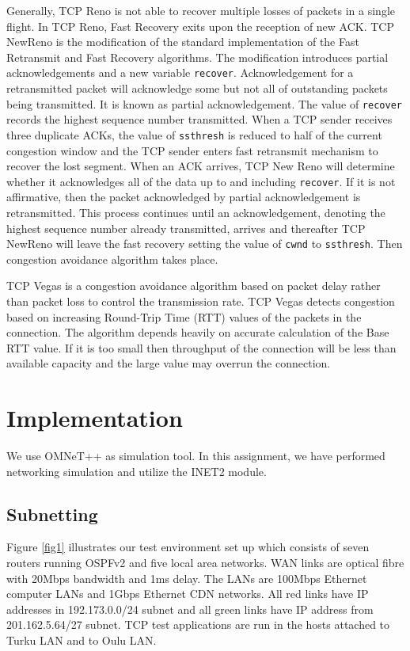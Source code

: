 \documentclass[conference,a4paper]{../../sty/IEEEtran}
\begin{document}
Generally, TCP Reno \cite{tcpreno} is not able to recover multiple losses of packets in a single flight. In TCP Reno, Fast Recovery exits upon the reception of new ACK. TCP NewReno is the modification of the standard implementation of the Fast Retransmit and Fast Recovery algorithms. The modification introduces partial acknowledgements and a new variable \texttt{recover}. Acknowledgement for a retransmitted packet will acknowledge some but not all of outstanding packets being transmitted. It is known as partial acknowledgement. The value of \texttt{recover} records the highest sequence number transmitted. When a TCP sender receives three duplicate ACKs, the value of \texttt{ssthresh} is reduced to half of the current congestion window and the TCP sender enters fast retransmit mechanism to recover the lost segment. When an ACK arrives, TCP New Reno will determine whether it acknowledges all of the data up to and including \texttt{recover}. If it is not affirmative, then the packet acknowledged by partial acknowledgement is retransmitted. This process continues until an acknowledgement, denoting the highest sequence number already transmitted, arrives and thereafter TCP NewReno \cite{tcpnewreno} will leave the fast recovery setting the value of \texttt{cwnd} to \texttt{ssthresh}. Then congestion avoidance algorithm takes place.


TCP Vegas \cite{brakmo1995tcp} is a congestion avoidance algorithm based on packet delay rather than packet loss to control the transmission rate. TCP Vegas detects congestion based on increasing Round-Trip Time (RTT) values of the packets in the connection. The algorithm depends heavily on accurate calculation of the Base RTT value. If it is too small then throughput of the connection will be less than available capacity and the large value may overrun the connection.

\section{Implementation}
We use OMNeT++ as simulation tool. In this assignment, we have performed networking simulation and utilize the INET2 module.

\subsection{Subnetting}

Figure \ref{fig1} illustrates our test environment set up which consists of seven routers running OSPFv2 and five local area networks.
WAN links are optical fibre with 20Mbps bandwidth and 1ms delay.
The LANs are 100Mbps Ethernet computer LANs and 1Gbps Ethernet CDN networks.
All red links have IP addresses in 192.173.0.0/24 subnet and all green links have IP address from 201.162.5.64/27 subnet.
TCP test applications are run in the hosts attached to Turku LAN and to Oulu LAN.
\end{document}
